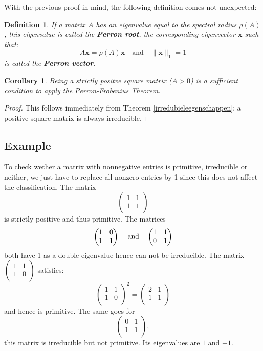 \documentclass[a4paper,11pt]{report}
\newtheorem{definition}[theorem]{Definition}
\newtheorem{corollary}[theorem]{Corollary}
\begin{document}
   
   With the previous proof in mind, the following definition comes not unexpected:
   
   \begin{definition}\label{perronroot}
     If a matrix $A$ has an eigenvalue equal to the spectral radius $\rho(A)$, this eigenvalue
     is called the \textbf{Perron root}, the corresponding eigenvector $\mathbf{x}$ such that:
     $$A\mathbf{x} = \rho(A)\mathbf{x} \quad \text{and} \quad \|\mathbf{x}\|_1 = 1$$ is called 
     the \textbf{Perron vector}.
   \end{definition}

\begin{corollary}
  Being a strictly positve square matrix ($A >0$) is a sufficient condition to apply the Perron-Frobenius Theorem.
\end{corollary}
\begin{proof}
  This follows immediately from Theorem \ref{irredubieleegenschappen}: a 
  positive square matrix is always irreducible.
\end{proof}  

\subsection{Example}
To check wether a matrix with nonnegative entries is primitive, irreducible or 
neither, we just have to replace all nonzero entries by 1 since this does not 
affect the classification. The matrix
$$\begin{pmatrix}1 & 1\\
1 & 1 \\
\end{pmatrix}$$
is strictly positive and thus primitive. The matrices
$$\begin{pmatrix}1 & 0\\
1 & 1 \\
\end{pmatrix}\text{\;\;\; and \;\;\,} 
\begin{pmatrix}
1 & 1\\
0 & 1 \\
\end{pmatrix}$$
both have 1 as a double eigenvalue hence can not be irreducible.
The matrix $\begin{pmatrix}
1 & 1\\
1 & 0 \\
\end{pmatrix}$ satisfies:
$$\begin{pmatrix}
1 & 1\\
1 & 0 \\
\end{pmatrix}^2 = \begin{pmatrix}
2 & 1\\
1 & 1 \\
\end{pmatrix}$$
and hence is primitive. The same goes for $$\begin{pmatrix}
0 & 1\\
1 & 1 \\
\end{pmatrix},$$ this matrix is irreducible but not primitive. Its 
eigenvalues are $1$ and $-1$.
\newpage
\end{document}
